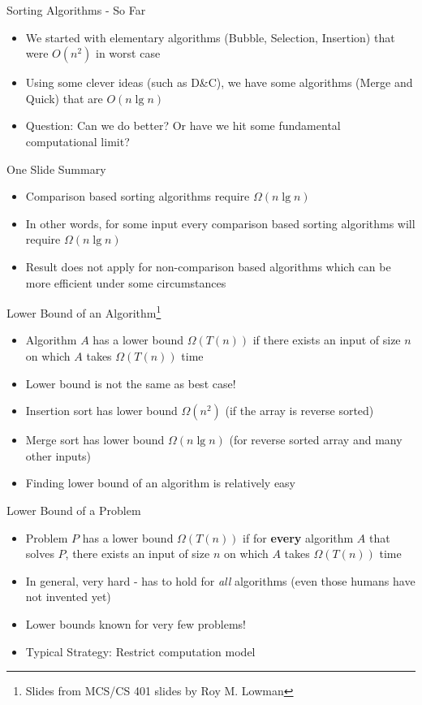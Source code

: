 \documentclass{beamer}
\begin{document}
\begin{frame}{Sorting Algorithms - So Far}
\begin{itemize}
\item We started with elementary algorithms (Bubble, Selection, Insertion) that were $O(n^2)$ in worst case
\item Using some clever ideas (such as D\&C), we have some algorithms (Merge and Quick) that are $O(n \lg n)$
\item Question: Can we do better? Or have we hit some fundamental computational limit?
\end{itemize}
\end{frame}



\begin{frame}{One Slide Summary}
\begin{itemize}
\item Comparison based sorting algorithms require $\Omega(n \lg n)$
\item In other words, for some input every comparison based sorting algorithms will require $\Omega(n \lg n)$
\item Result does not apply for non-comparison based algorithms which can be more efficient under some circumstances
\end{itemize}
\end{frame}



\begin{frame}{Lower Bound of an Algorithm\footnote{Slides from MCS/CS 401 slides by Roy M. Lowman}}
\begin{itemize}
\item Algorithm $A$ has a lower bound $\Omega(T(n))$ if there exists an input of size $n$ on which $A$ takes $\Omega(T(n))$ time
\item Lower bound is not the same as best case!
\item Insertion sort has lower bound $\Omega(n^2)$ (if the array is reverse sorted)
\item Merge sort has lower bound $\Omega(n \lg n)$ (for reverse sorted array and many other inputs)
\item Finding lower bound of an algorithm is relatively easy
\end{itemize}
\end{frame}



\begin{frame}{Lower Bound of a Problem}
\begin{itemize}
\item Problem $P$ has a lower bound $\Omega(T(n))$ if for {\bf every} algorithm $A$ that solves $P$, 
there exists an input of size $n$ on which $A$ takes $\Omega(T(n))$ time
\item In general, very hard - has to hold for {\em all} algorithms (even those humans have not invented yet)
\item Lower bounds known for very few problems!
\item Typical Strategy: Restrict computation model
\end{itemize}
\end{frame}
\end{document}
